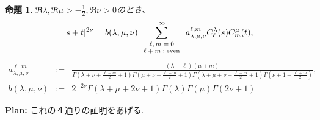 \documentclass[pdf,notes]{beamer}
\newcommand{\tmop}[1]{\ensuremath{\operatorname{#1}}}
\newtheorem{prop}{命題}
\newtheorem{remark}{注}
\begin{document}
\begin{frame}
	\begin{prop}\label{prop:exp-st-gg}
		$\Re\lambda,\Re\mu>-\frac{1}{2},\Re\nu>0$のとき、
		\begin{equation}
			| s + t |^{2 \nu} =b(\lambda,\mu,\nu) \sum_{\mbox{\scriptsize $\begin{array}[]{c}
			\ell, m = 0 \\ \ell + m : \tmop{even}
		\end{array}$}}^{\infty} a_{\lambda,\mu,\nu}^{\ell,m} C_\ell^{\lambda} (s) C_m^{\mu} (t),
			\label{eqn:exp-st-gg}
		\end{equation}
		{\scriptsize
			\begin{equation*}
				\begin{array}{rcl}
	a_{\lambda,\mu,\nu}^{\ell,m}&:=&\frac{ (\lambda + \ell) (\mu + m)   }{\Gamma \left( \lambda + \nu + \frac{\ell -
	  m}{2} + 1 \right)  \Gamma \left( \mu + \nu -
	  \frac{\ell - m}{2} + 1 \right)\Gamma \left( \lambda + \mu + \nu + \frac{\ell +
	  m}{2} + 1 \right)\Gamma\left(  \nu+1-\frac{\ell+m}{2}\right)},\\[0.4cm]
	  b(\lambda,\mu,\nu)&:=&2^{-2\nu}\Gamma (\lambda + \mu + 2 \nu + 1){\Gamma (\lambda)
	  \Gamma (\mu)\Gamma \left( 2\nu +
	1 \right)}
			\end{array}
			\end{equation*}
	}
	\end{prop}
	{\bf Plan:} これの４通りの証明をあげる.
\end{frame}
\end{document}
